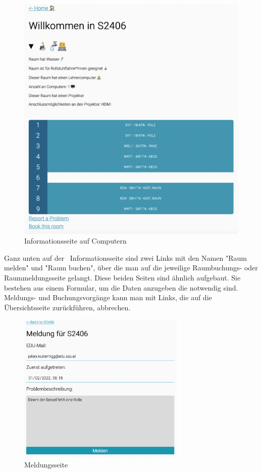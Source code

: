 \begin{figure}[H]
    \centering
    \includegraphics[width=120mm]{media/WebComponents/Rauminformationsseite.png}
    \caption{Informationsseite auf Computern}
    \label{fig:zeliainfopage}
\end{figure}

Ganz unten auf der \ZELIA\ Informationsseite sind zwei Links mit den Namen "Raum melden" und "Raum buchen", über die man auf die jeweilige Raumbuchungs- oder Raummeldungsseite gelangt. Diese beiden Seiten sind ähnlich aufgebaut. Sie bestehen aus einem Formular, um die Daten anzugeben die notwendig sind. Meldungs- und Buchungsvorgänge kann man mit Links, die auf die Übersichtsseite zurückführen, abbrechen.

\begin{figure}[H]
    \centering
    \includegraphics[width=80mm]{media/WebComponents/Meldungsseite_light.png}
    \caption{Meldungsseite}
    
\end{figure}


